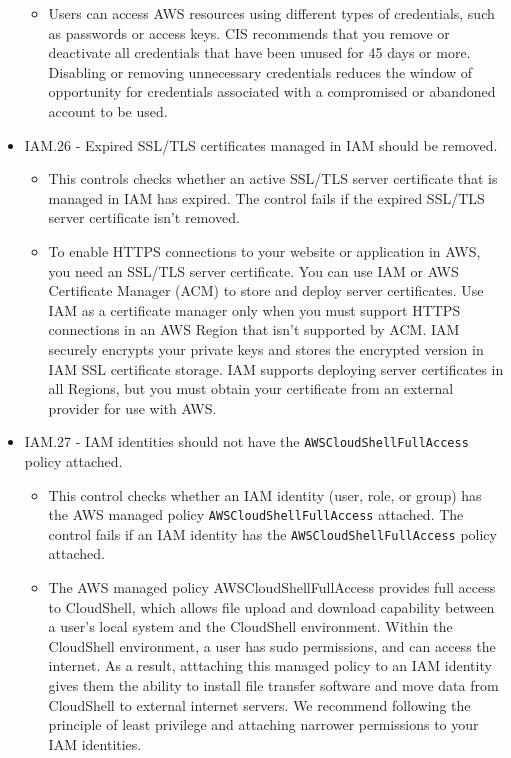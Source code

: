 \begin{mdframed}[backgroundcolor=gray!05, linecolor=gray!50]
\begin{itemize}
\begin{itemize}
        \item Users can access AWS resources using different types of credentials, such as passwords or access keys. CIS recommends that you remove or deactivate all credentials that have been unused for 45 days or more. Disabling or removing unnecessary credentials reduces the window of opportunity for credentials associated with a compromised or abandoned account to be used.
    \end{itemize}
    \item IAM.26 - Expired SSL/TLS certificates managed in IAM should be removed.
    \begin{itemize}
        \item This controls checks whether an active SSL/TLS server certificate that is managed in IAM has expired. The control fails if the expired SSL/TLS server certificate isn't removed.
        \item To enable HTTPS connections to your website or application in AWS, you need an SSL/TLS server certificate. You can use IAM or AWS Certificate Manager (ACM) to store and deploy server certificates. Use IAM as a certificate manager only when you must support HTTPS connections in an AWS Region that isn't supported by ACM. IAM securely encrypts your private keys and stores the encrypted version in IAM SSL certificate storage. IAM supports deploying server certificates in all Regions, but you must obtain your certificate from an external provider for use with AWS. 
    \end{itemize}
    \item IAM.27 -  IAM identities should not have the \texttt{AWSCloudShellFullAccess} policy attached.
    \begin{itemize}
        \item This control checks whether an IAM identity (user, role, or group) has the AWS managed policy \texttt{AWSCloudShellFullAccess} attached. The control fails if an IAM identity has the \texttt{AWSCloudShellFullAccess} policy attached.
        \item The AWS managed policy AWSCloudShellFullAccess provides full access to CloudShell, which allows file upload and download capability between a user's local system and the CloudShell environment. Within the CloudShell environment, a user has sudo permissions, and can access the internet. As a result, atttaching this managed policy to an IAM identity gives them the ability to install file transfer software and move data from CloudShell to external internet servers. We recommend following the principle of least privilege and attaching narrower permissions to your IAM identities.

\end{itemize}
\end{itemize}
\end{mdframed}
